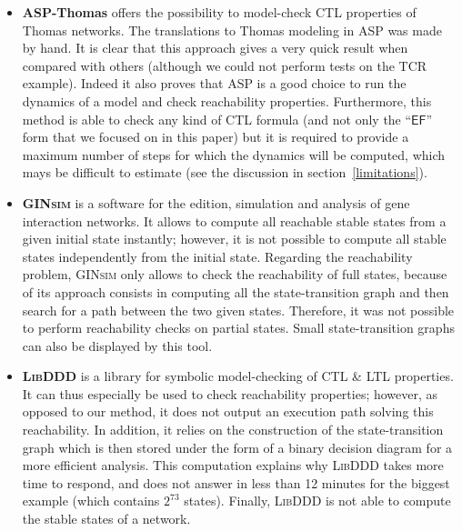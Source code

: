 \begin{itemize}

\item \textbf{ASP-Thomas} offers the possibility to model-check CTL properties
of Thomas networks.
The translations to Thomas modeling in ASP was made by hand.
It is clear that this approach gives a very quick result when compared with others
(although we could not perform tests on the TCR example).
Indeed it also proves that ASP is a good choice to run the dynamics of a model and check reachability properties.
Furthermore, this method is able to check any kind of CTL formula
(and not only the “$\mathsf{EF}$” form that we focused on in this paper)
but it is required to provide a maximum number of steps
for which the dynamics will be computed, which mays be difficult to estimate
(see the discussion in section~\ref{limitations}).

\item \textbf{\textsc{GINsim}} is a software for the edition, simulation and analysis
of gene interaction networks.
It allows to compute all reachable stable states from a given initial state instantly;
however, it is not possible to compute all stable states independently from the initial state.
Regarding the reachability problem, \textsc{GINsim} only allows to check the reachability of
full states, because of its approach consists in computing
all the state-transition graph and then search for a path between the two given states.
Therefore, it was not possible to perform reachability checks on partial states.
Small state-transition graphs can also be displayed by this tool.

\item \textbf{\textsc{LibDDD}}
is a library for symbolic model-checking of CTL \& LTL properties.
It can thus especially be used to check reachability properties;
however, as opposed to our method, it does not output an execution path
solving this reachability.
In addition, it relies on the construction of the state-transition graph
which is then stored under the form of a binary decision diagram for a more efficient analysis.
This computation explains why \textsc{LibDDD} takes more time to respond,
and does not answer in less than 12 minutes for the biggest example
(which contains $2^{73}$ states).
Finally, \textsc{LibDDD} is not able to compute the stable states of a network.


\end{itemize}
